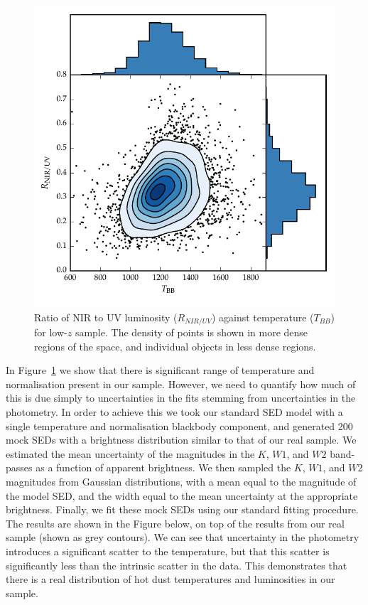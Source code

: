 \begin{figure}
  \centering
  \includegraphics[width=\textwidth]{figures/chapter05/ratio_tbb_density.pdf}
  \caption{Ratio of \ac{NIR} to UV luminosity ($R_{NIR/UV}$) against temperature ($T_{BB}$) for low-$z$ sample. The density of points is shown in more dense regions of the space, and individual objects in less dense regions. }
  \label{fig:ratio_tbb_density}
\end{figure}

In Figure~\ref{fig:ratio_tbb_density} we show that there is significant range of temperature and normalisation present in our sample. 
However, we need to quantify  how much of this is due simply to uncertainties in the fits stemming from uncertainties in the photometry. 
In order to achieve this we took our standard \ac{SED} model with a single temperature and normalisation blackbody component, and generated 200 mock \ac{SED}s with a brightness distribution similar to that of our real sample. 
We estimated the mean uncertainty of the magnitudes in the $K$, $W1$, and $W2$ band-passes as a function of apparent brightness. 
We then sampled the $K$, $W1$, and $W2$ magnitudes from Gaussian distributions, with a mean equal to the magnitude of the model \ac{SED}, and the width equal to the mean uncertainty at the appropriate brightness. 
Finally, we fit these mock \ac{SED}s using our standard fitting procedure. 
The results are shown in the Figure below, on top of the results from our real sample (shown as grey contours). 
We can see that uncertainty in the photometry introduces a significant scatter to the temperature, but that this scatter is significantly less than the intrinsic scatter in the data. 
This demonstrates that there is a real distribution of hot dust temperatures and luminosities in our sample. 

